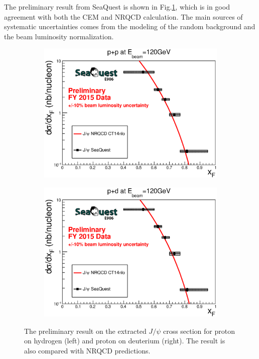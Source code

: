\documentclass[10pt, a4paper,final]{article}
\begin{document}
The preliminary result from SeaQuest is shown in Fig.\ref{fig:abs_cs_NRQCD},
which is in good agreement with both the CEM and NRQCD calculation. The main
sources of systematic uncertainties comes from the modeling of the random background
and the beam luminosity normalization.
\begin{figure}[htbp!]
	\centering
	\begin{subfigure}{0.45\linewidth}
		\includegraphics[width=0.9\linewidth]{jpsi_xF_LH2}
	\end{subfigure}
	\begin{subfigure}{0.45\linewidth}
		\includegraphics[width=0.9\linewidth]{jpsi_xF_LD2}
	\end{subfigure}
	\caption{The preliminary result on the extracted $J/\psi$ cross section for
		proton on hydrogen (left) and proton on deuterium (right). The result is
		also compared with NRQCD predictions.}
	\label{fig:abs_cs_NRQCD}
\end{figure}
\end{document}
